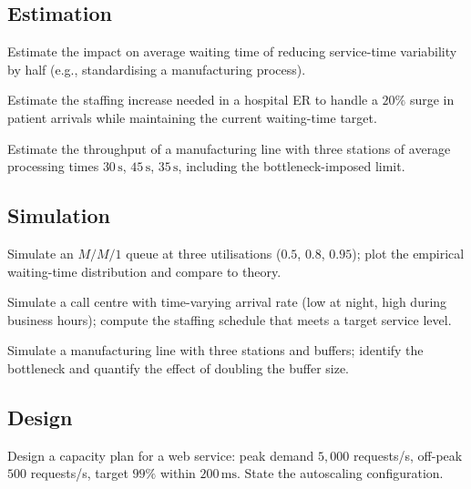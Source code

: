 \subsection*{Estimation}

\begin{exercise}
Estimate the impact on average waiting time of reducing service-time variability by half (e.g., standardising a manufacturing process).
\end{exercise}

\begin{exercise}
Estimate the staffing increase needed in a hospital ER to handle a $20\%$ surge in patient arrivals while maintaining the current waiting-time target.
\end{exercise}

\begin{exercise}
Estimate the throughput of a manufacturing line with three stations of average processing times $30\,\text{s}$, $45\,\text{s}$, $35\,\text{s}$, including the bottleneck-imposed limit.
\end{exercise}

\subsection*{Simulation}

\begin{exercise}
Simulate an $M/M/1$ queue at three utilisations ($0.5$, $0.8$, $0.95$); plot the empirical waiting-time distribution and compare to theory.
\end{exercise}

\begin{exercise}
Simulate a call centre with time-varying arrival rate (low at night, high during business hours); compute the staffing schedule that meets a target service level.
\end{exercise}

\begin{exercise}
Simulate a manufacturing line with three stations and buffers; identify the bottleneck and quantify the effect of doubling the buffer size.
\end{exercise}

\subsection*{Design}

\begin{exercise}
Design a capacity plan for a web service: peak demand $5{,}000$ requests/s, off-peak $500$ requests/s, target $99\%$ within $200\,\text{ms}$. State the autoscaling configuration.
\end{exercise}

